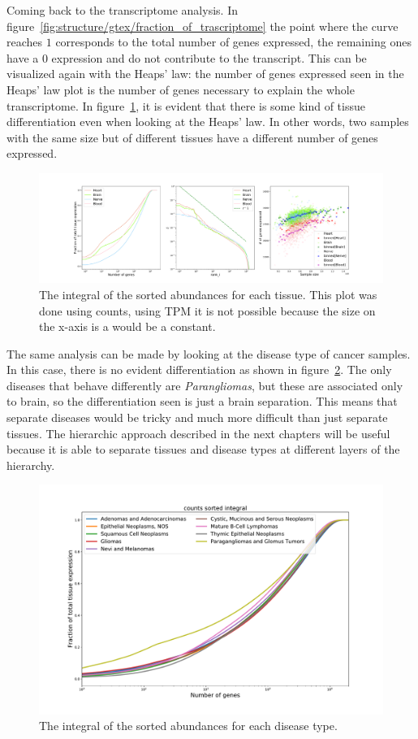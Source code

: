 Coming back to the transcriptome analysis. In figure~\ref{fig:structure/gtex/fraction_of_trascriptome} the point where the curve reaches $1$ corresponds to the total number of genes expressed, the remaining ones have a $0$ expression and do not contribute to the transcript. This can be visualized again with the Heaps' law: the number of genes expressed seen in the Heaps' law plot is the number of genes necessary to explain the whole transcriptome. In figure~\ref{fig:structure/gtex/heaps_tissue}, it is evident that there is some kind of tissue differentiation even when looking at the Heaps' law. In other words, two samples with the same size but of different tissues have a different number of genes expressed.
\begin{figure}[htb!]
  \centering
  \includegraphics[width=0.5\linewidth]{pictures/structure/gtex/heaps_tissue.pdf}
  \caption{The integral of the sorted abundances for each tissue. This plot was done using counts, using TPM it is not possible because the size on the x-axis is a would be a constant.}
  \label{fig:structure/gtex/heaps_tissue}
\end{figure}
The same analysis can be made by looking at the disease type of cancer samples. In this case, there is no evident differentiation as shown in figure~\ref{fig:structure/tcga/fraction_of_trascriptome_disease}. The only diseases that behave differently are \textit{Parangliomas}, but these are associated only to brain, so the differentiation seen is just a brain separation. This means that separate diseases would be tricky and much more difficult than just separate tissues. The hierarchic approach described in the next chapters will be useful because it is able to separate tissues and disease types at different layers of the hierarchy.
\begin{figure}[htb!]
  \centering
  \includegraphics[width=0.8\linewidth]{pictures/structure/tcga/fraction_of_trascriptome_disease.pdf}
  \caption{The integral of the sorted abundances for each disease type.}
  \label{fig:structure/tcga/fraction_of_trascriptome_disease}
\end{figure}

